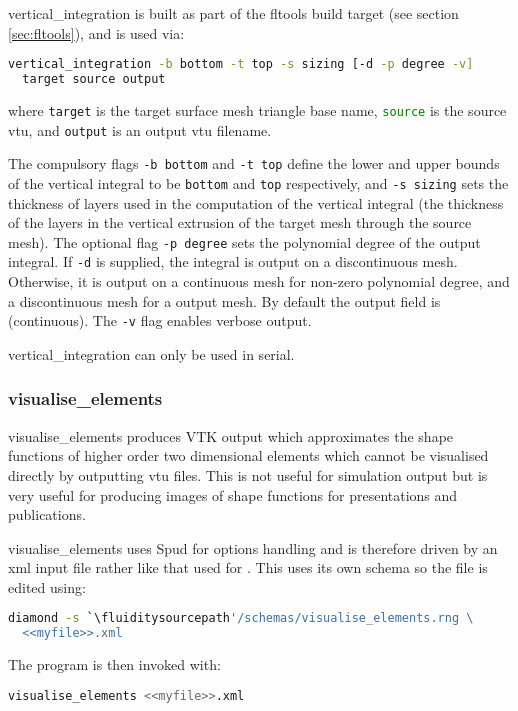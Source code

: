 vertical\_integration is built as part of the fltools build target (see section \ref{sec:fltools}),
and is used via:

\begin{lstlisting}[language = Bash]
vertical_integration -b bottom -t top -s sizing [-d -p degree -v]
  target source output
\end{lstlisting}

where \lstinline[language = Bash]+target+ is the target surface mesh triangle base name,
\lstinline[language = Bash]+source+ is the source vtu, and \lstinline[language = Bash]+output+
is an output vtu filename.

The compulsory flags \lstinline[language = Bash]+-b bottom+
and \lstinline[language = Bash]+-t top+ define the lower and upper bounds of
the vertical integral to be \lstinline[language = Bash]+bottom+ and \lstinline[language = Bash]+top+
respectively, and \lstinline[language = Bash]+-s sizing+ sets the thickness of layers
used in the computation of the vertical integral (the thickness of the layers in the
vertical extrusion of the target mesh through the source mesh). The optional
flag \lstinline[language = Bash]+-p degree+ sets the polynomial degree of the
output integral. If \lstinline[language = Bash]+-d+ is supplied, the integral
is output on a discontinuous mesh. Otherwise, it is output on a continuous
mesh for non-zero polynomial degree, and a discontinuous mesh for a \Pzero
output mesh. By default the output field is \Pone (continuous).
The \lstinline[language = Bash]+-v+ flag enables verbose output.

vertical\_integration can only be used in serial.


\subsubsection{visualise\_elements}
\label{sec:visualise_elements}

visualise\_elements produces VTK output which approximates the shape
functions of higher order two dimensional elements which cannot be
visualised directly by outputting vtu files. This is not useful for
simulation output but is very useful for producing images of shape functions
for presentations and publications.

visualise\_elements uses Spud for options handling and is therefore driven
by an xml input file rather like that used for \fluidity. This uses its own
schema so the file is edited using:
\begin{lstlisting}[language=Bash]
diamond -s `\fluiditysourcepath'/schemas/visualise_elements.rng \
  <<myfile>>.xml
\end{lstlisting}
The program is then invoked with:
\begin{lstlisting}[language=Bash]
visualise_elements <<myfile>>.xml
\end{lstlisting}

